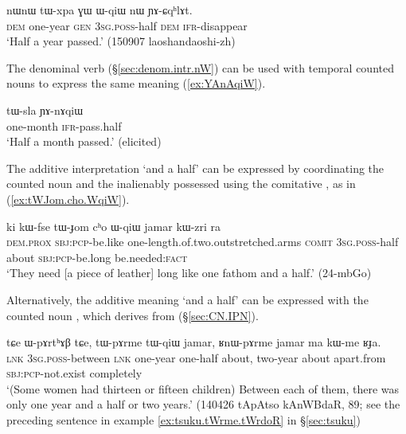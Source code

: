 \begin{exe}
\ex \label{ex:tWxpa.WqiW}
\gll nɯnɯ tɯ-xpa ɣɯ ɯ-qiɯ nɯ ɲɤ-ɕqʰlɤt. \\
\textsc{dem} one-year \textsc{gen} \textsc{3sg}.\textsc{poss}-half \textsc{dem} \textsc{ifr}-disappear \\
\glt  `Half a year passed.' (150907 laoshandaoshi-zh)
\end{exe}

The denominal verb  (§\ref{sec:denom.intr.nW}) can be used with temporal counted nouns to express the same meaning (\ref{ex:YAnAqiW}).

\begin{exe}
	\ex \label{ex:YAnAqiW}
	\gll tɯ-sla ɲɤ-nɤqiɯ \\
	one-month \textsc{ifr}-pass.half \\
	\glt `Half a month passed.' (elicited)
\end{exe}

The additive interpretation  `and a half' can be expressed by coordinating the counted noun and the inalienably possessed  using the comitative , as in (\ref{ex:tWJom.cho.WqiW}).

\begin{exe}
\ex \label{ex:tWJom.cho.WqiW}
\gll ki kɯ-fse tɯ-ɟom cʰo ɯ-qiɯ jamar kɯ-zri ra \\
 \textsc{dem}.\textsc{prox} \textsc{sbj}:\textsc{pcp}-be.like one-length.of.two.outstretched.arms \textsc{comit} \textsc{3sg}.\textsc{poss}-half about \textsc{sbj}:\textsc{pcp}-be.long be.needed:\textsc{fact} \\
\glt `They need [a piece of leather] long like one fathom and a half.' (24-mbGo)
\end{exe}

Alternatively, the additive meaning `and a half' can be expressed with the counted noun , which derives from   (§\ref{sec:CN.IPN}). 

\begin{exe}
\ex \label{ex:tWqiW}
\gll tɕe ɯ-pɤrtʰɤβ tɕe, tɯ-pɤrme tɯ-qiɯ jamar, ʁnɯ-pɤrme jamar ma kɯ-me ʁɟa. \\
 \textsc{lnk} \textsc{3sg}.\textsc{poss}-between \textsc{lnk} one-year one-half about, two-year about apart.from \textsc{sbj}:\textsc{pcp}-not.exist completely  \\
\glt  `(Some women had thirteen or fifteen children) Between each of them, there was only one year and a half or two years.' (140426 tApAtso kAnWBdaR, 89; see the preceding sentence in example \ref{ex:tsuku.tWrme.tWrdoR} in §\ref{sec:tsuku})
\end{exe}

